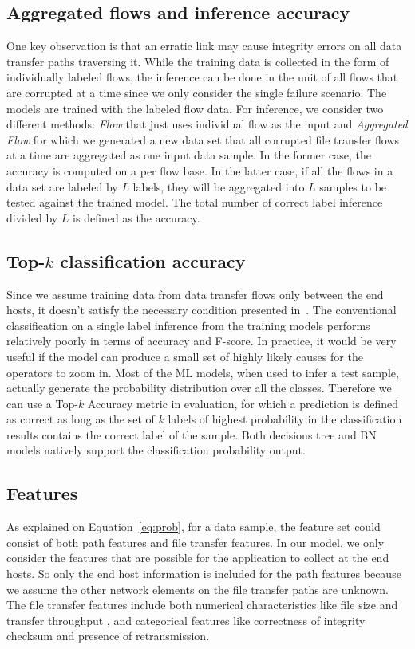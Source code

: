 {\subsection{Aggregated flows and inference accuracy}
One key observation is that an erratic link may cause integrity errors on all data transfer paths traversing it. While the training data is collected in the form of individually labeled flows, the inference can be done in the unit of all flows that are corrupted at a time since we only consider the single failure scenario. The models are trained with the labeled flow data.  For inference, we consider two different methods: {\it Flow} that just uses individual flow as the input and {\it Aggregated Flow} for which we generated a new data set that all corrupted file transfer flows at a time are aggregated as one input data sample. In the former case, the accuracy is computed on a per flow base. In the latter case, if all the flows in a data set are labeled by $L$ labels, they will be aggregated into $L$ samples to be tested against the trained model. The total number of correct label inference divided by $L$ is defined as the accuracy.

\subsection{Top-$k$ classification accuracy} 
Since we assume training data from data transfer flows only between the end hosts, it doesn't satisfy the necessary condition presented in~\cite{netbouncer:nsdi18}. The conventional classification on a single label inference from the training models performs relatively poorly in terms of accuracy and F-score. In practice, it would be very useful if the model can produce a small set of highly likely causes for the operators to zoom in. Most of the ML models, when used to infer a test sample, actually generate the probability distribution over all the classes. Therefore we can use a Top-$k$ Accuracy metric in evaluation, for which a prediction is defined as correct as long as the set of $k$ labels of highest probability in the classification results contains the correct label of the sample. Both decisions tree and BN models natively support the classification probability output. 

\subsection{Features}
As explained on Equation~\ref{eq:prob}, for a data sample, the feature set could consist of both path features and file transfer features. In our model, we only consider the features that are possible for the application to collect at the end hosts.
So only the end host information is included for the path features because we assume the other network elements on the file transfer paths are unknown. 
The file transfer features include both numerical characteristics like file size and transfer throughput , and categorical features like correctness of integrity checksum and presence of retransmission. 

}

